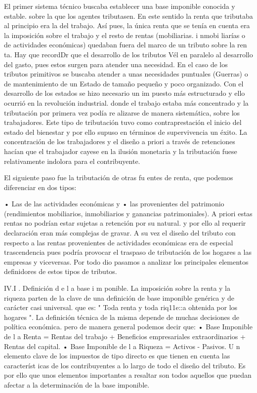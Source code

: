 \documentclass[10pt,a4paper]{article}
\begin{document}
El primer sistema técnico buscaba establecer una base imponible conocida y estable. sobre la que los agentes tributasen. En este sentido la renta que tributaba al principio era la del trabajo. Así pues, la única renta que se tenía en cuenta era la imposición sobre el trabajo y el resto de rentas (mobiliarias. i nmobi liarías o de actividades económicas) quedaban fuera del marco de un tributo sobre la ren ta. Hay que recordDr que el desarrollo de los tributos Vél en paralelo al desarrollo del gasto, pues estos surgen para atender una necesidad. En el caso de los tributos primitivos se buscaba atender a unas necesidades puntuales (Guerras) o de mantenimiento de un Estado de tamaño pequeño y poco organizado. Con el desarrollo de los estados se hizo necesario un im puesto más estructurado y ello ocurrió en la revolución industrial. donde el trabajo estaba más concentrado y la tributación por primera vez podía re alizarse de manera sistemática, sobre los trabajadores. Este tipo de tributación tuvo como contraprestación el inicio del estado del bienestar y por ello supuso en términos de supervivencia un éxito. La concentración de los trabajadores y el diseño a priori a través de retenciones hacían que el trabajador cayese en la ilusión monetaria y la tributación fuese relativamente indolora para el contribuyente.

El siguiente paso fue la tributación de otras fu entes de renta, que podemos diferenciar en dos tipos:

• Las de las actividades económicas y • las provenientes del patrimonio (rendimientos mobiliarios, inmobiliarios y ganancias patrimoniales). A priori estas rentas no podrían estar sujetas a retención por su natural. y por ello al requerir declaración eran más complejas de gravar. A su vez el diseño del tributo con respecto a las rentas provenientes de actividades económicas era de especial trascendencia pues podría provocar el traspaso de tributación de los hogares a las empresas y viceversas. Por todo dio pasamos a analizar los principales elementos definidores de estos tipos de tributos.

IV.I . Definición d e l a base i m ponible.
La imposición sobre la renta y la riqueza parten de la clave de una definición de base imponible genérica y de carácter casi universal. que es:
" Toda renta y toda riq11e::a ohtenida por los hogares ".
La definición técnica de la misma depende de muchas decisiones de política económica. pero de manera general podemos decir que:
• Base Imponible de l a Renta = Rentas del trabajo + Beneficios empresariales extraordinarios + Rentas del capital.
• Base Imponible de l a Riqueza = Activos - Pasivos. 
U n elemento clave de los impuestos de tipo directo es que tienen en cuenta las característ icas de los contribuyentes a lo largo de todo el diseño del tributo. Es por ello que unos elementos importantes a resaltar son todos aquellos que puedan afectar a la determinación de la base imponible.
\end{document}
